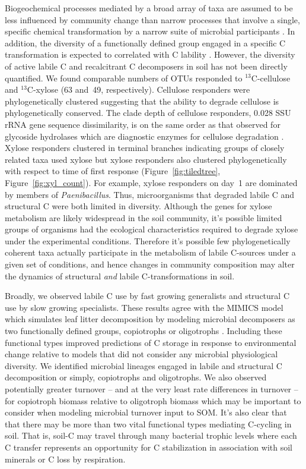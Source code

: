 Biogeochemical processes mediated by a broad array of taxa are assumed to
be less influenced by community change than narrow processes that involve
a single, specific chemical transformation by a narrow suite of microbial
participants \citep{Schimel_1995,McGuire2010}. In addition, the diversity of
a functionally defined group engaged in a specific C transformation is expected
to correlated with C lability \citep{McGuire2010}. However, the diversity of
active labile C and recalcitrant C decomposers in soil has not been directly
quantified. We found comparable numbers of OTUs responded to $^{13}$C-cellulose
and $^{13}$C-xylose (63 and~49, respectively). Cellulose responders were
phylogenetically clustered suggesting that the ability to degrade cellulose is
phylogenetically conserved. The clade depth of cellulose responders, 0.028 SSU
rRNA gene sequence dissimilarity, is on the same order as that observed for
glycoside hydrolases which are diagnostic enzymes for cellulose degradation
\citep{Berlemont2013}. Xylose responders clustered in terminal branches
indicating groups of closely related taxa used xylose but xylose responders
also clustered phylogenetically with respect to time of first response
(Figure~\ref{fig:tiledtree}, Figure~\ref{fig:xyl_count}). For example, xylose
responders on day~1 are dominated by members of \textit{Paenibacillus}. Thus,
microorganisms that degraded labile C and structural C were both limited in
diversity. Although the genes for xylose metabolism are likely widespread in
the soil community, it's possible limited groups of organisms had the
ecological characteristics required to degrade xylose under the experimental
conditions. Therefore it's possible few phylogenetically coherent taxa actually
participate in the metabolism of labile C-sources under a given set of
conditions, and hence changes in community composition may alter the dynamics
of structural \textit{and} labile C-transformations in soil.

Broadly, we observed labile C use by fast growing generalists and structural
C use by slow growing specialists. These results agree with the MIMICS model
which simulates leaf litter decomposition by modeling microbial decomposers
as two functionally defined groups, copiotrophs or oligotrophs
\citep{wieder_2014a}. Including these functional types improved predictions
of C storage in response to environmental change relative to models that did
not consider any microbial physiological diversity. We identified microbial
lineages engaged in labile and structural C decomposition or simply,
copiotrophs and oligotrophs. We also observed potentially greater turnover --
and at the very least rate differences in turnover -- for copiotroph biomass
relative to oligotroph biomass which may be important to consider when modeling
microbial turnover input to SOM. It's also clear that that there may be more
than two vital functional types mediating C-cycling in soil. That is, soil-C
may travel through many bacterial trophic levels where each C transfer
represents an opportunity for C stabilization in association with soil minerals
or C loss by respiration.

